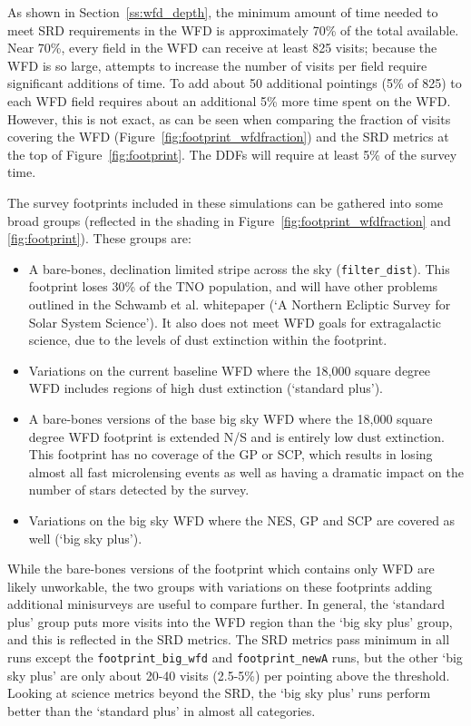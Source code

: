 As shown in Section~\ref{ss:wfd_depth}, the minimum amount of time needed to meet SRD requirements in the WFD is approximately 70\% of the total available. Near 70\%, every field in the WFD can receive at least 825 visits;  because the WFD is so large, attempts to increase the number of visits per field require significant additions of time. To add about 50 additional pointings (5\% of 825) to each WFD field requires about an additional 5\% more time spent on the WFD. However, this is not exact, as can be seen when comparing the fraction of visits covering the WFD (Figure~\ref{fig:footprint_wfdfraction}) and the SRD metrics at the top of Figure~\ref{fig:footprint}. The DDFs will require at least 5\% of the survey time. 

The survey footprints included in these simulations can be gathered into some broad groups (reflected in the shading in Figure~\ref{fig:footprint_wfdfraction} and \ref{fig:footprint}). These groups are:
\begin{itemize}
\item A bare-bones, declination limited stripe across the sky ({\tt filter\_dist}). This footprint loses 30\% of the TNO population, and will have other problems outlined in the Schwamb et al. whitepaper (`A Northern Ecliptic Survey for Solar System Science'). It also does not meet WFD goals for extragalactic science, due to the levels of dust extinction within the footprint.
\item Variations on the current baseline WFD where the 18,000 square degree WFD includes regions of high dust extinction (`standard plus').
\item A bare-bones versions of the base big sky WFD where the 18,000 square degree WFD footprint is extended N/S and is entirely low dust extinction. This footprint has no coverage of the GP or SCP, which results in losing almost all fast microlensing events as well as having a dramatic impact on the number of stars detected by the survey.
\item Variations on the big sky WFD where the NES, GP and SCP are covered as well (`big sky plus'). 
\end{itemize}
While the bare-bones versions of the footprint which contains only WFD are likely unworkable, the two groups with variations on these footprints adding additional minisurveys are useful to compare further.
In general, the `standard plus' group puts more visits into the WFD region than the `big sky plus' group, and this is reflected in the SRD metrics. The SRD metrics pass minimum in all runs except the {\tt footprint\_big\_wfd} and {\tt footprint\_newA} runs, but the other `big sky plus' are only about 20-40 visits  (2.5-5\%) per pointing above the threshold. Looking at science metrics beyond the SRD, the `big sky plus' runs perform better than the `standard plus' in almost all categories.


